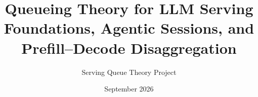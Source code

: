 
\title{Queueing Theory for LLM Serving\\[0.4em]
\large Foundations, Agentic Sessions, and Prefill--Decode Disaggregation}
\author{Serving Queue Theory Project}
\date{September 2026}

\hypersetup{pageanchor=false}
\maketitle
\hypersetup{pageanchor=true}
\tableofcontents











